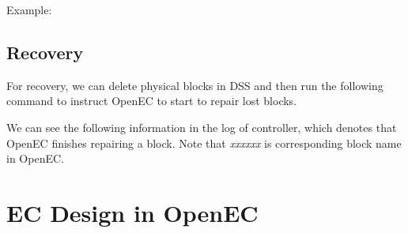 \documentclass[letterpaper,12pt]{article}
\newcommand{\openec}{{\sf\small OpenEC}\xspace}
\begin{document}
Example:
\begin{center}
\noindent{}
\end{center}

\subsection{Recovery}

For recovery, we can delete physical blocks in DSS and then run the following command to instruct \openec 
to start to repair lost blocks.

\begin{center}
\noindent{}
\end{center}

We can see the following information in the log of controller, which denotes that \openec finishes repairing a block.
Note that {\sl xxxxxx} is corresponding block name in \openec.

\begin{center}
\noindent{}
\end{center}

\section{EC Design in OpenEC}
\end{document}

